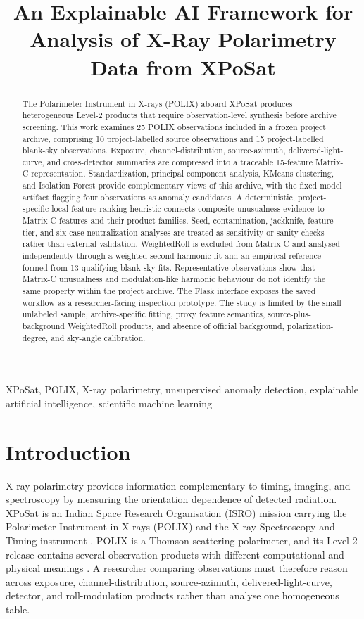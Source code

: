 \documentclass[conference]{IEEEtran}
\title{An Explainable AI Framework for Analysis of X-Ray Polarimetry Data from XPoSat}
\author{
\IEEEauthorblockN{Author One, Author Two, Author Three, and Author Four}
\IEEEauthorblockA{Department of [Department Name], [College/University]\\
[City, Country]\\
[corresponding-author email]}
}
\begin{document}
\maketitle

\begin{abstract}
The Polarimeter Instrument in X-rays (POLIX) aboard XPoSat produces heterogeneous Level-2 products that require observation-level synthesis before archive screening. This work examines 25 POLIX observations included in a frozen project archive, comprising 10 project-labelled source observations and 15 project-labelled blank-sky observations. Exposure, channel-distribution, source-azimuth, delivered-light-curve, and cross-detector summaries are compressed into a traceable 15-feature Matrix-C representation. Standardization, principal component analysis, KMeans clustering, and Isolation Forest provide complementary views of this archive, with the fixed model artifact flagging four observations as anomaly candidates. A deterministic, project-specific local feature-ranking heuristic connects composite unusualness evidence to Matrix-C features and their product families. Seed, contamination, jackknife, feature-tier, and six-case neutralization analyses are treated as sensitivity or sanity checks rather than external validation. WeightedRoll is excluded from Matrix C and analysed independently through a weighted second-harmonic fit and an empirical reference formed from 13 qualifying blank-sky fits. Representative observations show that Matrix-C unusualness and modulation-like harmonic behaviour do not identify the same property within the project archive. The Flask interface exposes the saved workflow as a researcher-facing inspection prototype. The study is limited by the small unlabeled sample, archive-specific fitting, proxy feature semantics, source-plus-background WeightedRoll products, and absence of official background, polarization-degree, and sky-angle calibration.
\end{abstract}

\begin{IEEEkeywords}
XPoSat, POLIX, X-ray polarimetry, unsupervised anomaly detection, explainable artificial intelligence, scientific machine learning
\end{IEEEkeywords}

\section{Introduction}
X-ray polarimetry provides information complementary to timing, imaging, and spectroscopy by measuring the orientation dependence of detected radiation. XPoSat is an Indian Space Research Organisation (ISRO) mission carrying the Polarimeter Instrument in X-rays (POLIX) and the X-ray Spectroscopy and Timing instrument \cite{isro_xposat}. POLIX is a Thomson-scattering polarimeter, and its Level-2 release contains several observation products with different computational and physical meanings \cite{rishin2010thomson,fabiani2018instrumentation,polix_handbook_2025}. A researcher comparing observations must therefore reason across exposure, channel-distribution, source-azimuth, delivered-light-curve, detector, and roll-modulation products rather than analyse one homogeneous table.
\end{document}
